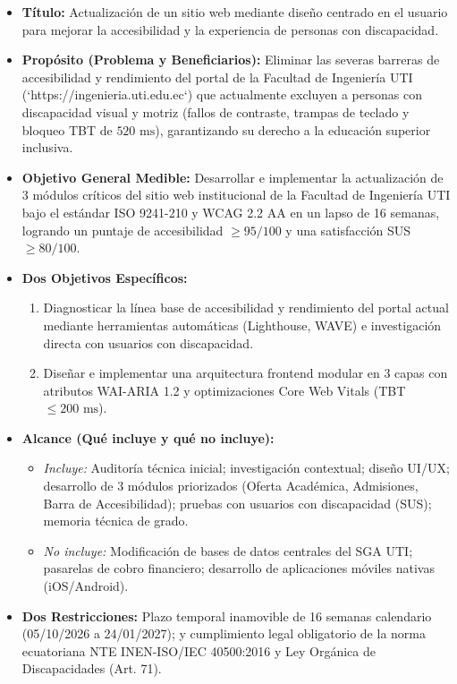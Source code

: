 \documentclass[10pt,a4paper]{article}
\begin{document}
\begin{itemize}\setlength\itemsep{2pt}\small
    \item \textbf{Título:} Actualización de un sitio web mediante diseño centrado en el usuario para mejorar la accesibilidad y la experiencia de personas con discapacidad.
    \item \textbf{Propósito (Problema y Beneficiarios):} Eliminar las severas barreras de accesibilidad y rendimiento del portal de la Facultad de Ingeniería UTI (`https://ingenieria.uti.edu.ec`) que actualmente excluyen a personas con discapacidad visual y motriz (fallos de contraste, trampas de teclado y bloqueo TBT de $520\text{ ms}$), garantizando su derecho a la educación superior inclusiva.
    \item \textbf{Objetivo General Medible:} Desarrollar e implementar la actualización de 3 módulos críticos del sitio web institucional de la Facultad de Ingeniería UTI bajo el estándar ISO 9241-210 y WCAG 2.2 AA en un lapso de 16 semanas, logrando un puntaje de accesibilidad $\ge 95/100$ y una satisfacción SUS $\ge 80/100$.
    \item \textbf{Dos Objetivos Específicos:}
    \begin{enumerate}\footnotesize
        \item Diagnosticar la línea base de accesibilidad y rendimiento del portal actual mediante herramientas automáticas (Lighthouse, WAVE) e investigación directa con usuarios con discapacidad.
        \item Diseñar e implementar una arquitectura frontend modular en 3 capas con atributos WAI-ARIA 1.2 y optimizaciones Core Web Vitals (TBT $\le 200\text{ ms}$).
    \end{enumerate}
    \item \textbf{Alcance (Qué incluye y qué no incluye):}
    \begin{itemize}\footnotesize
        \item \textit{Incluye:} Auditoría técnica inicial; investigación contextual; diseño UI/UX; desarrollo de 3 módulos priorizados (Oferta Académica, Admisiones, Barra de Accesibilidad); pruebas con usuarios con discapacidad (SUS); memoria técnica de grado.
        \item \textit{No incluye:} Modificación de bases de datos centrales del SGA UTI; pasarelas de cobro financiero; desarrollo de aplicaciones móviles nativas (iOS/Android).
    \end{itemize}
    \item \textbf{Dos Restricciones:} Plazo temporal inamovible de 16 semanas calendario (05/10/2026 a 24/01/2027); y cumplimiento legal obligatorio de la norma ecuatoriana NTE INEN-ISO/IEC 40500:2016 y Ley Orgánica de Discapacidades (Art. 71).

\end{itemize}
\end{document}
